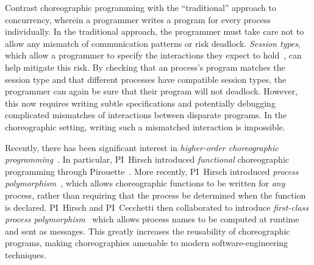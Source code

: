 Contrast choreographic programming with the ``traditional'' approach to concurrency, wherein a programmer writes a program for every process individually.
In the traditional approach, the programmer must take care not to allow any mismatch of communication patterns or risk deadlock.
\emph{Session types}, which allow a programmer to specify the interactions they expect to hold~\cite{DeYoungCPT09,CairesP10,GayV10,Wadler12,ScalasY19}, can help mitigate this risk.
By checking that an process's program matches the session type and that different processes have compatible session types, the programmer can again be sure that their program will not deadlock.
However, this now requires writing subtle specifications and potentially debugging complicated mismatches of interactions between disparate programs.
In the choreographic setting, writing such a mismatched interaction is impossible.

Recently, there has been significant interest in \emph{higher-order choreographic programming}~\cite{GraversenHM24,GiallorenzoMP23,CruzFilipeGLMP22,HirschG22,ShenKK23,SamuelsonHC25}.
In particular, PI~Hirsch introduced \emph{functional} choreographic programming through Pirouette~\cite{HirschG22}.
More recently, PI~Hirsch introduced \emph{process polymorphism}~\cite{GraversenHM24}, which allows choreographic functions to be written for \emph{any} process, rather than requiring that the process be determined when the function is declared.
PI~Hirsch and PI~Cecchetti then collaborated to introduce \emph{first-class process polymorphism}~\cite{SamuelsonHC25} which allows process names to be computed at runtime and sent as messages.
This greatly increases the reusability of choreographic programs, making choreographies amenable to modern software-engineering techniques.


